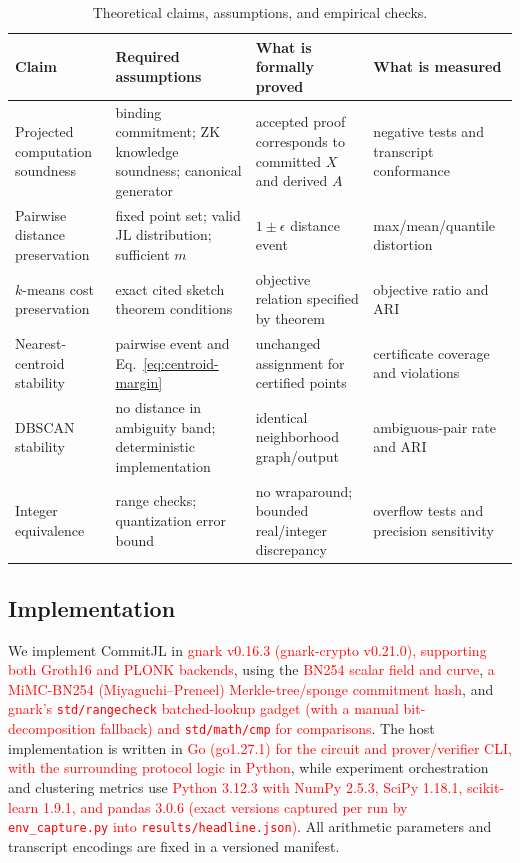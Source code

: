 \documentclass[pdflatex,sn-mathphys-num,iicol]{sn-jnl}
\newcommand{\newtext}[1]{\textcolor{red}{#1}}
\newcommand{\tpexplain}[1]{}
\theoremstyle{plain}
\theoremstyle{definition}
\theoremstyle{remark}
\begin{document}
\begin{table}[!htbp]
\caption{Theoretical claims, assumptions, and empirical checks.}\label{tab:claims}
\centering\small
\begin{adjustbox}{max width=\textwidth}
\begin{tabularx}{\textwidth}{@{}Y Y Y Y@{}}
\toprule
Claim & Required assumptions & What is formally proved & What is measured \\
\midrule
Projected computation soundness & binding commitment; ZK knowledge soundness; canonical generator & accepted proof corresponds to committed $X$ and derived $A$ & negative tests and transcript conformance \\
Pairwise distance preservation & fixed point set; valid JL distribution; sufficient $m$ & $1\pm\epsilon$ distance event & max/mean/quantile distortion \\
$k$-means cost preservation & exact cited sketch theorem conditions & objective relation specified by theorem & objective ratio and ARI \\
Nearest-centroid stability & pairwise event and Eq.~\eqref{eq:centroid-margin} & unchanged assignment for certified points & certificate coverage and violations \\
DBSCAN stability & no distance in ambiguity band; deterministic implementation & identical neighborhood graph/output & ambiguous-pair rate and ARI \\
Integer equivalence & range checks; quantization error bound & no wraparound; bounded real/integer discrepancy & overflow tests and precision sensitivity \\
\bottomrule
\end{tabularx}
\end{adjustbox}
\end{table}

\subsection{Implementation}\label{sec:implementation}

\tpexplain{Paragraph 1 --- name versions, curves/fields, commitment hash, proof backend, language, and hardware-neutral design choices. Do not postpone key reproducibility facts to a repository.}
We implement CommitJL in \newtext{gnark v0.16.3 (gnark-crypto v0.21.0), supporting both Groth16 and PLONK backends}, using the \newtext{BN254 scalar field and curve}, \newtext{a MiMC-BN254 (Miyaguchi--Preneel) Merkle-tree/sponge commitment hash}, and \newtext{gnark's \texttt{std/rangecheck} batched-lookup gadget (with a manual bit-decomposition fallback) and \texttt{std/math/cmp} for comparisons}. The host implementation is written in \newtext{Go (go1.27.1) for the circuit and prover/verifier CLI, with the surrounding protocol logic in Python}, while experiment orchestration and clustering metrics use \newtext{Python 3.12.3 with NumPy 2.5.3, SciPy 1.18.1, scikit-learn 1.9.1, and pandas 3.0.6 (exact versions captured per run by \texttt{env\_capture.py} into \texttt{results/headline.json})}. All arithmetic parameters and transcript encodings are fixed in a versioned manifest.
\end{document}
